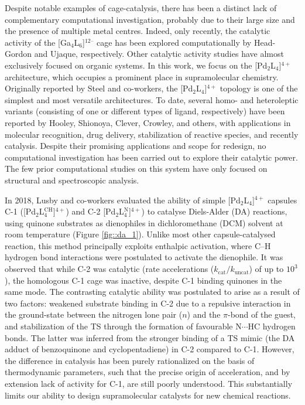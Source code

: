 \documentclass[../../main.tex]{subfiles}
\begin{document}
Despite notable examples of cage-catalysis, there has been a distinct lack of complementary computational investigation, probably due to their large size and the presence of multiple metal centres. Indeed, only recently, the catalytic activity of the [Ga$_4$L$_6$]$^{12–}$ cage has been explored computationally by Head-Gordon and Ujaque, respectively.\cite{VaissierWelborn2018, Norjmaa2019} Other catalytic activity studies have almost exclusively focused on organic systems.\cite{Pahima2019, Chakraborty2019, Goehry2015, Daver2017, Daver2018} In this work, we focus on the [Pd$_2$L$_4$]$^{4+}$ architecture, which occupies a prominent place in supramolecular chemistry.\cite{Lewis2012, Schmidt2014, Preston2016, Vasdev2017, Preston2017} Originally reported by Steel and co-workers,\cite{McMorran1998} the [Pd$_2$L$_4$]$^{4+}$ topology is one of the simplest and most versatile architectures.\cite{Schmidt2014, Vasdev2017} To date, several homo- and heteroleptic variants (consisting of one or different types of ligand, respectively) have been reported by Hooley,\cite{Liao2010} Shionoya,\cite{Clever2009} Clever,\cite{Bloch2017, Zhu2018, Li2019, Chen2019} Crowley,\cite{Lewis2013, McNeill2015} and others,\cite{Jansze2017, Chand2001, Kishi2011} with applications in molecular recognition,\cite{Kishi2011} drug delivery,\cite{Lewis2012} stabilization of reactive species,\cite{Yamashina2014} and recently catalysis.\cite{MartCentelles2018} Despite their promising applications and scope for redesign, no computational investigation has been carried out to explore their catalytic power. The few prior computational studies on this system have only focused on structural\cite{Preston2016} and spectroscopic analysis.\cite{Schmidt2016} 

In 2018, Lusby and co-workers evaluated the ability of simple [Pd$_2$L$_4$]$^{4+}$ capsules C-1 ([Pd$_2$L$^{\text{CH}}_4$]$^{4+}$) and C-2 [Pd$_2$L$^{\text{N}}_4$]$^{4+}$) to catalyse Diels-Alder (DA) reactions, using quinone substrates as dienophiles in dichloromethane (DCM) solvent at room temperature (Figure \ref{fig::da_1}).\cite{MartCentelles2018} Unlike most other capsule-catalysed reaction, this method principally exploits enthalpic activation, where C–H hydrogen bond interactions were postulated to activate the dienophile. It was observed that while C-2 was catalytic (rate accelerations ($k_\text{cat}/k_\text{uncat}$) of up to $10^3$), the homologous C-1 cage was inactive, despite C-1 binding quinones in the same mode. The contrasting catalytic ability was postulated to arise as a result of two factors: weakened substrate binding in C-2 due to a repulsive interaction in the ground-state between the nitrogen lone pair ($n$) and the $\pi$-bond of the guest, and stabilization of the TS through the formation of favourable N$\cdots$HC hydrogen bonds. The latter was inferred from the stronger binding of a TS mimic (the DA adduct of benzoquinone and cyclopentadiene) in C-2 compared to C-1.\cite{MartCentelles2018} However, the difference in catalysis has been purely rationalized on the basis of thermodynamic parameters, such that the precise origin of acceleration, and by extension lack of activity for C-1, are still poorly understood. This substantially limits our ability to design supramolecular catalysts for new chemical reactions. 
\end{document}
